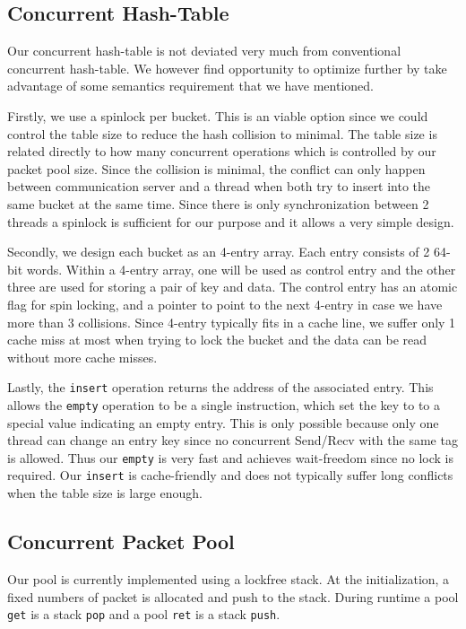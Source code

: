 \documentclass[11pt]{article}
\begin{document}
\subsection{Concurrent Hash-Table}
Our concurrent hash-table is not deviated very much from conventional
concurrent hash-table. We however find opportunity to optimize further by take
advantage of some semantics requirement that we have mentioned.

Firstly, we use a spinlock per bucket. This is an viable option since we could
control the table size to reduce the hash collision to minimal. The table size is
related directly to how many concurrent operations which is controlled by 
our packet pool size. Since the collision is minimal, the conflict can only happen
between communication server and a thread when both try to insert into the same
bucket at the same time. Since there is only synchronization between 2 threads
a spinlock is sufficient for our purpose and it allows a very simple design.

Secondly, we design each bucket as an 4-entry array. Each entry consists of 2
64-bit words. Within a 4-entry array, one will be used as control entry and the
other three are used for storing a pair of key and data. The control entry has
an atomic flag for spin locking, and a pointer to point to the next 4-entry in
case we have more than 3 collisions. Since 4-entry typically fits in a cache
line, we suffer only 1 cache miss at most when trying to lock the bucket and
the data can be read without more cache misses.

Lastly, the \texttt{insert} operation returns the address of the associated
entry. This allows the \texttt{empty} operation to be a single instruction,
which set the key to to a special value indicating an empty entry. This is only
possible because only one thread can change an entry key since no concurrent
Send/Recv with the same tag is allowed. Thus our \texttt{empty} is very fast
and achieves wait-freedom since no lock is required. Our \texttt{insert} is
cache-friendly and does not typically suffer long conflicts when the table size
is large enough.

\subsection{Concurrent Packet Pool}
Our pool is currently implemented using a lockfree stack. At the
initialization, a fixed numbers of packet is allocated and push to the stack.
During runtime a pool \texttt{get} is a stack \texttt{pop} and a pool
\texttt{ret} is a stack \texttt{push}.
\end{document}
